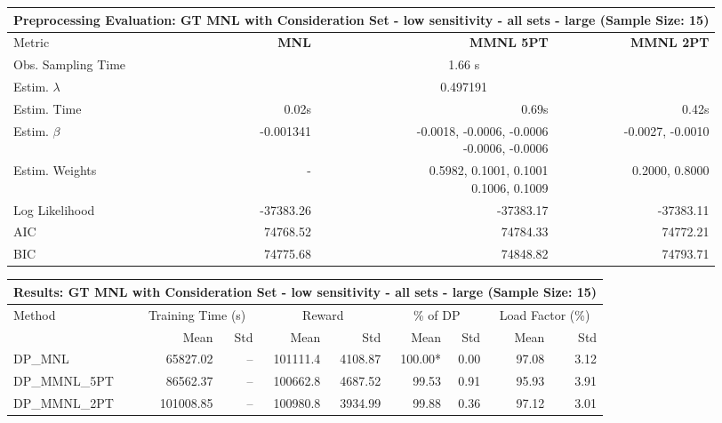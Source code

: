 
\begin{samepage}
\begin{center}
  \small
  \begin{tabular}{l|r|r|r}
    \toprule
    \multicolumn{4}{c}{\textbf{Preprocessing Evaluation: GT MNL with Consideration Set - low sensitivity - all sets - large (Sample Size: 15)}} \\
    \midrule
    Metric & \textbf{MNL} & \textbf{MMNL 5PT} & \textbf{MMNL 2PT} \\
    \midrule
    Obs. Sampling Time & \multicolumn{3}{c}{1.66 s} \\
    Estim. $\lambda$ & \multicolumn{3}{c}{0.497191} \\
    Estim. Time & 0.02s & 0.69s & 0.42s \\
    Estim. $\beta$ & -0.001341 & \makecell[tr]{-0.0018, -0.0006, -0.0006 \\ -0.0006, -0.0006} & -0.0027, -0.0010 \\
    Estim. Weights & - & \makecell[tr]{0.5982, 0.1001, 0.1001 \\ 0.1006, 0.1009} & 0.2000, 0.8000 \\
    Log Likelihood & -37383.26 & -37383.17 & -37383.11 \\
    AIC & 74768.52 & 74784.33 & 74772.21 \\
    BIC & 74775.68 & 74848.82 & 74793.71 \\
    \bottomrule
  \end{tabular}
\end{center}
\begin{center}
  \small
  \begin{tabular}{l|rr|rr|rr|rr}
    \toprule
    \multicolumn{9}{c}{\textbf{Results: GT MNL with Consideration Set - low sensitivity - all sets - large (Sample Size: 15)}} \\
    \midrule
    Method & \multicolumn{2}{c|}{Training Time (s)} & \multicolumn{2}{c|}{Reward} & \multicolumn{2}{c|}{\% of DP} & \multicolumn{2}{c}{Load Factor (\%)} \\
    & Mean & Std & Mean & Std & Mean & Std & Mean & Std \\
    \midrule
    DP\_MNL      & 65827.02 &    -- &   101111.4 &    4108.87 & 100.00* &    0.00 &   97.08 &    3.12 \\
    DP\_MMNL\_5PT & 86562.37 &    -- &   100662.8 &    4687.52 &   99.53 &    0.91 &   95.93 &    3.91 \\
    DP\_MMNL\_2PT & 101008.85 &    -- &   100980.8 &    3934.99 &   99.88 &    0.36 &   97.12 &    3.01 \\

\end{tabular}
\end{center}
\end{samepage}
